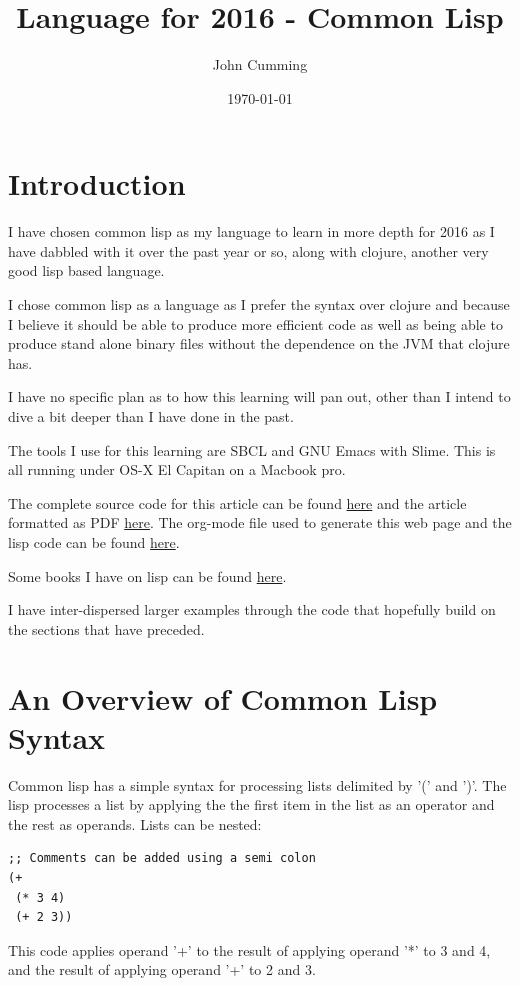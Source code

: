 \documentclass[11pt]{article}
\author{John Cumming}
\date{\today}
\title{Language for 2016 - Common Lisp}
\begin{document}
\maketitle
\tableofcontents


\section{Introduction}
\label{sec-1}

I have chosen common lisp as my language to learn in more depth for
2016 as I have dabbled with it over the past year or so, along with
clojure, another very good lisp based language.

I chose common lisp as a language as I prefer the syntax over
clojure and because I believe it should be able to produce more
efficient code as well as being able to produce stand alone binary
files without the dependence on the JVM that clojure has.

I have no specific plan as to how this learning will pan out, other
than I intend to dive a bit deeper than I have done in the past.

The tools I use for this learning are SBCL and GNU Emacs with
Slime. This is all running under OS-X El Capitan on a Macbook pro.

The complete source code for this article can be found \href{2016-lisp.lisp}{here} and the
article formatted as PDF \href{2016-lisp.pdf}{here}. The org-mode file used to generate
this web page and the lisp code can be found \href{2016-lisp.org}{here}.

Some books I have on lisp can be found \href{books.org}{here}.

I have inter-dispersed larger examples through the code that
hopefully build on the sections that have preceded.

\section{An Overview of Common Lisp Syntax}
\label{sec-2}

Common lisp has a simple syntax for processing lists delimited by '('
and ')'. The lisp processes a list by applying the the first item in
the list as an operator and the rest as operands. Lists can be
nested:

\begin{verbatim}
;; Comments can be added using a semi colon
(+
 (* 3 4)
 (+ 2 3))
\end{verbatim}
This code applies operand '+' to the result of applying operand '*'
to 3 and 4, and the result of applying operand '+' to 2 and 3.
\end{document}
